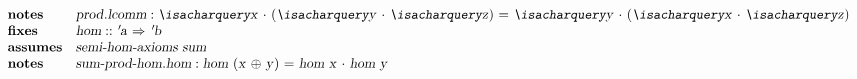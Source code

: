 \begin{isabellebody}
\begin{isamarkuptext}
\[\begin{array}{ll}
  \textbf{notes} & \isa{prod{\isachardot}lcomm}: \isa{{\isachardoublequote}{\isacharquery}x\ {\isasymcdot}\ {\isacharparenleft}{\isacharquery}y\ {\isasymcdot}\ {\isacharquery}z{\isacharparenright}\ {\isacharequal}\ {\isacharquery}y\ {\isasymcdot}\ {\isacharparenleft}{\isacharquery}x\ {\isasymcdot}\ {\isacharquery}z{\isacharparenright}{\isachardoublequote}} \\
  \textbf{fixes} & \isa{hom} :: \isa{{\isachardoublequote}{\isacharprime}a\ {\isasymRightarrow}\ {\isacharprime}b{\isachardoublequote}} \\
  \textbf{assumes} & \isa{{\isachardoublequote}semi{\isacharunderscore}hom{\isacharunderscore}axioms\ sum{\isachardoublequote}} \\
  \textbf{notes} & \isa{sum{\isacharunderscore}prod{\isacharunderscore}hom{\isachardot}hom}:
    \isa{hom\ {\isacharparenleft}x\ {\isasymoplus}\ y{\isacharparenright}\ {\isacharequal}\ hom\ x\ {\isasymcdot}\ hom\ y}
\end{array}
\]


\end{isamarkuptext}
\end{isabellebody}
